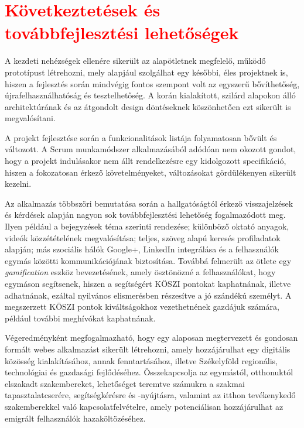 \chapter{\textcolor{red}{Következtetések és továbbfejlesztési lehetőségek}}
\label{ch:kovetkeztetes}

A kezdeti nehézségek ellenére sikerült az alapötletnek megfelelő, működő prototípust létrehozni, mely alapjául szolgálhat egy későbbi, éles projektnek is, hiszen a fejlesztés során mindvégig fontos szempont volt az egyszerű bővíthetőség, újrafelhasználhatóság és tesztelhetőség.  A korán kialakított, szilárd alapokon álló architektúrának és az átgondolt design döntéseknek köszönhetően ezt sikerült is megvalósítani. 

A projekt fejlesztése során a funkcionalitások listája folyamatosan bővült és változott. A Scrum munkamódszer alkalmazásából adódóan nem okozott gondot, hogy a projekt indulásakor nem állt rendelkezésre egy kidolgozott specifikáció, hiszen a fokozatosan érkező követelményeket, változásokat gördülékenyen sikerült kezelni. 

Az alkalmazás többszöri bemutatása során a hallgatóságtól érkező visszajelzések és kérdések alapján nagyon sok továbbfejlesztési lehetőség fogalmazódott meg. Ilyen például a bejegyzések téma szerinti rendezése; különböző oktató anyagok, videók közzétételének megvalósítása; teljes, szöveg alapú keresés profiladatok alapján; más szociális hálók Google+, LinkedIn integrálása és a felhasználók egymás közötti kommunikációjának biztosítása. Továbbá felmerült az ötlete egy \textit{gamification} eszköz bevezetésének, amely ösztönözné a felhasználókat, hogy egymáson segítsenek, hiszen a segítségért KÖSZI pontokat kaphatnának, illetve adhatnának, ezáltal nyilvános elismerésben részesítve a jó szándékú személyt. A megszerzett KÖSZI pontok kiváltságokhoz vezethetnének gazdájuk számára, például további meghívókat kaphatnának. 

Végeredményként megfogalmazható, hogy egy alaposan megtervezett és gondosan formált webes alkalmazást sikerült létrehozni, amely hozzájárulhat egy digitális közösség kialakításához, annak fenntartásához, illetve Székelyföld regionális, technológiai és gazdasági fejlődéséhez. Összekapcsolja az egymástól, otthonuktól elszakadt szakembereket, lehetőséget teremtve számukra a szakmai tapasztalatcserére, segítségkérésre és -nyújtásra, valamint az itthon tevékenykedő szakemberekkel való kapcsolatfelvételre, amely potenciálisan hozzájárulhat az emigrált felhasználók hazaköltözéséhez. 
